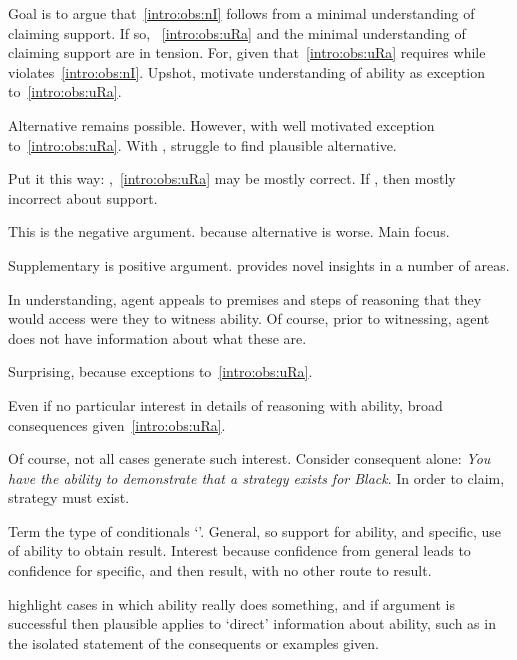 \begin{note}
  Goal is to argue that~\ref{intro:obs:nI} follows from a minimal understanding of claiming support.
  If so, ~\ref{intro:obs:uRa} and the minimal understanding of claiming support are in tension.
  For, given that~\ref{intro:obs:uRa} requires \AR{} while \AR{} violates~\ref{intro:obs:nI}.
  Upshot, motivate \WR{} understanding of ability as exception to~\ref{intro:obs:uRa}.

  Alternative remains possible.
  However, with \WR{} well motivated exception to~\ref{intro:obs:uRa}.
  With \AR{}, struggle to find plausible alternative.

  Put it this way:
  \WR{},~\ref{intro:obs:uRa} may be mostly correct.
  If \AR{}, then mostly incorrect about support.

  This is the negative argument.
  \WR{} because alternative is worse.
  Main focus.

  Supplementary is positive argument.
  \WR{} provides novel insights in a number of areas.
\end{note}


\begin{note}
  In \WR{} understanding, agent appeals to premises and steps of reasoning that they would access were they to witness ability.
  Of course, prior to witnessing, agent does not have information about what these are.

  Surprising, because exceptions to~\ref{intro:obs:uRa}.

  Even if no particular interest in details of reasoning with ability, broad consequences given~\ref{intro:obs:uRa}.
\end{note}

\begin{note}[GSI]
  Of course, not all cases generate such interest.
  Consider consequent alone:
  \emph{You have the ability to demonstrate that a strategy exists for Black}.
  In order to claim, strategy must exist.

  Term the type of conditionals `\gsi{}'.
  General, so support for ability, and specific, use of ability to obtain result.
  Interest because confidence from general leads to confidence for specific, and then result, with no other route to result.

  \gsi{} highlight cases in which ability really does something, and if argument is successful then plausible applies to `direct' information about ability, such as in the isolated statement of the consequents or examples given.
\end{note}


